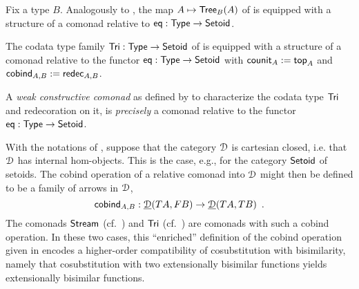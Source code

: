 \documentclass[a4paper,USenglish]{lipics}
\begin{document}
\begin{Long}

\begin{ex}[Trees]\label{ex_tree_comonad}
 Fix a type $B$. Analogously to , the map $A \mapsto \mathsf{Tree}_B(A)$ of 
 is equipped with a structure of a comonad relative to $\mathsf{eq}: \mathsf{Type}\to\mathsf{Setoid}$.
\end{ex}

\end{Long}

\begin{ex}\label{ex:tri_comonad}
  The codata type family $\mathsf{Tri} : \mathsf{Type} \to \mathsf{Setoid}$ of  is equipped with a structure of a comonad relative to the functor 
  $\mathsf{eq} : \mathsf{Type} \to \mathsf{Setoid}$ with
   $\mathsf{counit}_A := \mathsf{top}_A$ and
   $\mathsf{cobind}_{A,B} := \mathsf{redec}_{A,B}$.
\end{ex}

\begin{Long}
\begin{rem}
  A \emph{weak constructive comonad} as defined by \textcite{DBLP:conf/types/MatthesP11} to characterize the codata type $\mathsf{Tri}$
  and redecoration on it, is \emph{precisely}
  a comonad relative to the functor $\mathsf{eq} : \mathsf{Type}\to\mathsf{Setoid}$.
\end{rem}
\end{Long}

\begin{Long}
\begin{rem}
 With the notations of , suppose that the category $\mathcal{D}$ is cartesian closed, i.e. that $\mathcal{D}$ has
 internal hom-objects. This is the case, e.g., for the category $\mathsf{Setoid}$ of setoids.
 The cobind operation of a relative comonad into $\mathcal{D}$ might then be defined to be a family of arrows in $\mathcal{D}$,
  \begin{equation}\mathsf{cobind}_{A,B} : \underline{\mathcal{D}}(TA,FB) \to \underline{\mathcal{D}}(TA,TB) \enspace . \label{eq_enriched}\end{equation}
 The comonads $\mathsf{Stream}$ (cf.\ ) and $\mathsf{Tri}$ (cf.\ ) are comonads with such a cobind operation. In these two cases, this \enquote{enriched} definition of the cobind operation given in  encodes a higher-order 
 compatibility of cosubstitution with bisimilarity, namely that cosubstitution with two extensionally bisimilar functions
 yields extensionally bisimilar functions.
\end{rem}
\end{Long}
\end{document}
